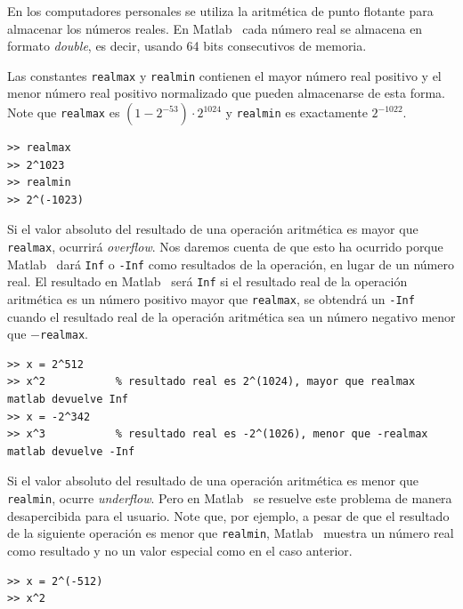 \documentclass[letter,11pt]{article}
\newcommand\0{\mathbf{0}}
\newcommand{\matlab}{{\sc Matlab }}
\begin{document}
	En los computadores personales se utiliza la aritm\'etica de punto flotante para
	almacenar los n\'umeros reales. En \matlab\, cada n\'umero real se almacena en formato {\em double}, es decir,
	usando 64 bits consecutivos de memoria.
    
Las constantes \texttt{realmax} y \texttt{realmin} contienen el mayor
n\'umero real positivo y el menor n\'umero real positivo normalizado que
pueden almacenarse de esta forma. Note que \texttt{realmax} es
$(1-2^{-53}) \cdot 2^{1024}$ y \texttt{realmin} es exactamente $2^{-1022}$.

\medskip

\begin{lstlisting}
>> realmax
>> 2^1023
>> realmin
>> 2^(-1023)
\end{lstlisting}

\medskip
	
	Si el valor absoluto del resultado de una operaci\'on aritm\'etica
	es mayor que \Verb+realmax+, ocu\-rri\-r\'a {\em overflow}. Nos daremos cuenta
	de que esto ha ocurrido porque \matlab\, dar\'a
	\Verb+Inf+ o \Verb+-Inf+ como resultados de la operaci\'on, en lugar de
	un n\'umero real.
	El resultado en \matlab\, ser\'a \Verb+Inf+ si el resultado real de
	la operaci\'on aritm\'etica es un n\'umero positivo mayor que \Verb+realmax+,
	se obtendr\'a un \Verb+-Inf+ cuando el resultado real
	de la operaci\'on aritm\'etica sea un n\'umero negativo menor que $-$\Verb+realmax+.

\newpage

\begin{lstlisting}[gobble=2,frame=single]
>> x = 2^512
>> x^2           % resultado real es 2^(1024), mayor que realmax matlab devuelve Inf
>> x = -2^342
>> x^3           % resultado real es -2^(1026), menor que -realmax  matlab devuelve -Inf
\end{lstlisting}

\medskip

	Si el valor absoluto del resultado de una operaci\'on aritm\'etica es menor
	que \Verb+realmin+, ocurre {\em underflow}. Pero en \matlab\, se resuelve
	este problema de manera desapercibida para el usuario. Note que, por ejemplo,
	a pesar de que el resultado de la siguiente operaci\'on es menor que \Verb+realmin+,
	\matlab\, muestra un n\'umero real como resultado y no un valor especial como en el caso
	anterior.

\medskip

\begin{lstlisting}[gobble=2,frame=single]
>> x = 2^(-512)
>> x^2
\end{lstlisting}
\end{document}
